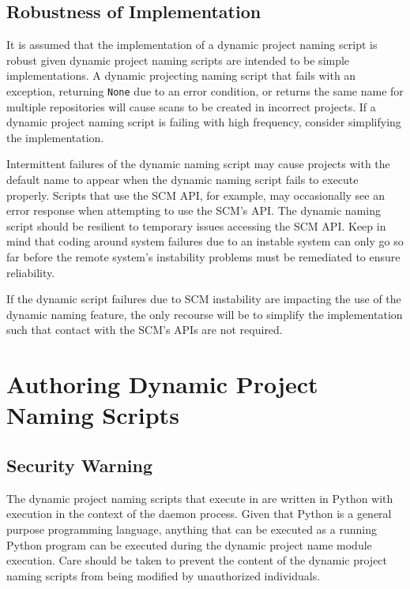 \subsection{Robustness of Implementation}

It is assumed that the implementation of a dynamic project naming script is robust given dynamic project naming scripts
are intended to be simple implementations.  A dynamic projecting naming script that fails with an exception, returning \texttt{None} due to an error
condition, or returns the same name for multiple repositories will cause scans to be created in incorrect projects.  If
a dynamic project naming script is failing with high frequency, consider simplifying the implementation.

Intermittent failures of the dynamic naming script may cause projects with the default name to appear when the dynamic
naming script fails to execute properly.  Scripts that use the SCM API, for example, may occasionally see an error
response when attempting to use the SCM's API.  The dynamic naming script should be resilient to temporary issues
accessing the SCM API.  Keep in mind that coding around system failures due to an instable system can only go so
far before the remote system's instability problems must be remediated to ensure reliability.

If the dynamic script failures due to SCM instability are impacting the use of the dynamic naming feature, the
only recourse will be to simplify the implementation such that contact with the SCM's APIs are not required.


\section{Authoring Dynamic Project Naming Scripts}

\subsection{Security Warning}

The dynamic project naming scripts that execute in \cxoneflow are written in Python with execution in the context of
the \cxoneflow daemon process.  Given that Python is a general purpose programming language, anything that can be executed
as a running Python program can be executed during the dynamic project name module execution.  Care should be taken to
prevent the content of the dynamic project naming scripts from being modified by unauthorized individuals.

